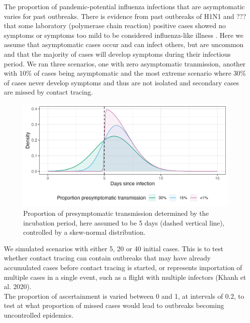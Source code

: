 \documentclass{article}
\begin{document}
The proportion of pandemic-potential influenza infections that are asymptomatic varies for past outbreaks. There is evidence from past outbreaks of H1N1 and ??? that some laboratory (polymerase chain reaction) positive cases showed no symptoms or symptoms too mild to be considered influenza-like illness \citep{lesslerOutbreak2009Pandemic2009}. Here we assume that asymptomatic cases occur and can infect others, but are uncommon and that the majority of cases will develop symptoms during their infectious period.  We ran three scenarios, one with zero asymptomatic tranmission, another with 10\% of cases being asymptomatic and the most extreme scenario where 30\% of cases never develop symptoms and thus are not isolated and secondary cases are missed by contact tracing. \\

\begin{figure}[ht]
\centering
\includegraphics[width=\textwidth]{../plots/prop_presymptomatic_transmission.png}
\caption{Proportion of presymptomatic transmission determined by the incubation period, here assumed to be 5 days (dashed vertical line), controlled by a skew-normal distribution.}
\label{fig:prop-presym-trans}
\end{figure}

\clearpage

We simulated scenarios with either 5, 20 or 40 initial cases. This is to test whether contact tracing can contain outbreaks that may have already accumulated cases before contact tracing is started, or represents importation of multiple cases in a single event, such as a flight with multiple infectors (Khanh et al. 2020). \\

The proportion of ascertainment is varied between 0 and 1, at intervals of 0.2, to test at what proportion of missed cases would lead to outbreaks becoming uncontrolled epidemics. \\
\end{document}
